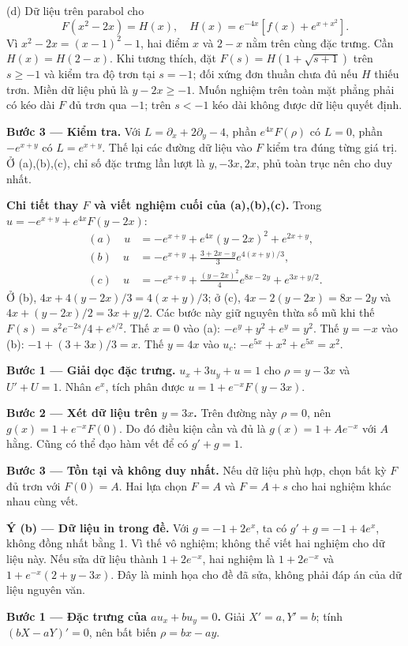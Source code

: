 (d) Dữ liệu trên parabol cho
\[F(x^2-2x)=H(x),\quad H(x)=e^{-4x}[f(x)+e^{x+x^2}].\]
Vì $x^2-2x=(x-1)^2-1$, hai điểm $x$ và $2-x$ nằm trên cùng đặc trưng. Cần $H(x)=H(2-x)$. Khi tương thích, đặt $F(s)=H(1+\sqrt{s+1})$ trên $s\ge-1$ và kiểm tra độ trơn tại $s=-1$; đối xứng đơn thuần chưa đủ nếu $H$ thiếu trơn. Miền dữ liệu phủ là $y-2x\ge-1$. Muốn nghiệm trên toàn mặt phẳng phải có kéo dài $F$ đủ trơn qua $-1$; trên $s<-1$ kéo dài không được dữ liệu quyết định.

\textbf{Bước 3 — Kiểm tra.} Với $L=\partial_x+2\partial_y-4$, phần $e^{4x}F(\rho)$ có $L=0$, phần $-e^{x+y}$ có $L=e^{x+y}$. Thế lại các đường dữ liệu vào $F$ kiểm tra đúng từng giá trị. Ở (a),(b),(c), chỉ số đặc trưng lần lượt là $y,-3x,2x$, phủ toàn trục nên cho duy nhất.

\textbf{Chi tiết thay $F$ và viết nghiệm cuối của (a),(b),(c).} Trong $u=-e^{x+y}+e^{4x}F(y-2x)$:
\[\begin{aligned}
(a)\quad u&=-e^{x+y}+e^{4x}(y-2x)^2+e^{2x+y},\\
(b)\quad u&=-e^{x+y}+\frac{3+2x-y}{3}e^{4(x+y)/3},\\
(c)\quad u&=-e^{x+y}+\frac{(y-2x)^2}{4}e^{8x-2y}+e^{3x+y/2}.
\end{aligned}\]
Ở (b), $4x+4(y-2x)/3=4(x+y)/3$; ở (c), $4x-2(y-2x)=8x-2y$ và $4x+(y-2x)/2=3x+y/2$. Các bước này giữ nguyên thừa số mũ khi thế $F(s)=s^2e^{-2s}/4+e^{s/2}$.
Thế $x=0$ vào (a): $-e^y+y^2+e^y=y^2$. Thế $y=-x$ vào (b): $-1+(3+3x)/3=x$. Thế $y=4x$ vào $u_c$: $-e^{5x}+x^2+e^{5x}=x^2$.

\textbf{Bước 1 — Giải dọc đặc trưng.} $u_x+3u_y+u=1$ cho $\rho=y-3x$ và $U'+U=1$. Nhân $e^x$, tích phân được $u=1+e^{-x}F(y-3x)$.

\textbf{Bước 2 — Xét dữ liệu trên $y=3x$.} Trên đường này $\rho=0$, nên $g(x)=1+e^{-x}F(0)$. Do đó điều kiện cần và đủ là $g(x)=1+Ae^{-x}$ với $A$ hằng. Cũng có thể đạo hàm vết để có $g'+g=1$.

\textbf{Bước 3 — Tồn tại và không duy nhất.} Nếu dữ liệu phù hợp, chọn bất kỳ $F$ đủ trơn với $F(0)=A$. Hai lựa chọn $F=A$ và $F=A+s$ cho hai nghiệm khác nhau cùng vết.

\textbf{Ý (b) — Dữ liệu in trong đề.} Với $g=-1+2e^x$, ta có $g'+g=-1+4e^x$, không đồng nhất bằng 1. Vì thế vô nghiệm; không thể viết hai nghiệm cho dữ liệu này. Nếu sửa dữ liệu thành $1+2e^{-x}$, hai nghiệm là $1+2e^{-x}$ và $1+e^{-x}(2+y-3x)$. Đây là minh họa cho đề đã sửa, không phải đáp án của dữ liệu nguyên văn.

\textbf{Bước 1 — Đặc trưng của $au_x+bu_y=0$.} Giải $X'=a,Y'=b$; tính $(bX-aY)'=0$, nên bất biến $\rho=bx-ay$.

